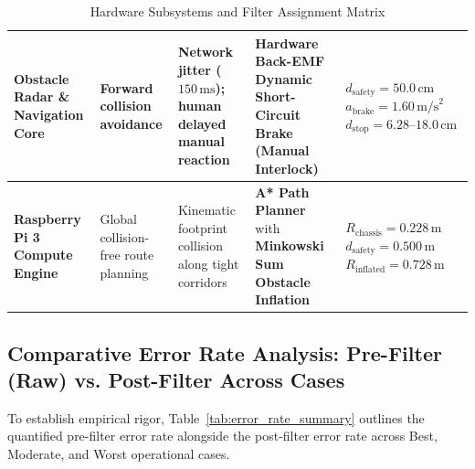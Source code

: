 \documentclass[11pt, a4paper]{article}
\begin{document}
\begin{table}[H]
\begin{tabularx}{\textwidth}{L{2.5cm} L{2.5cm} L{3.5cm} L{3.5cm} Y}
\midrule
\textbf{Obstacle Radar \& Navigation Core} & Forward collision avoidance & Network jitter ($150\,\text{ms}$); human delayed manual reaction & \textbf{Hardware Back-EMF Dynamic Short-Circuit Brake} (Manual Interlock) & $d_{\text{safety}} = 50.0\,\text{cm}$ \newline $a_{\text{brake}} = 1.60\,\text{m/s}^2$ \newline $d_{\text{stop}} = 6.28\text{--}18.0\,\text{cm}$ \\
\midrule
\textbf{Raspberry Pi 3 Compute Engine} & Global collision-free route planning & Kinematic footprint collision along tight corridors & \textbf{A* Path Planner} with \textbf{Minkowski Sum Obstacle Inflation} & $R_{\text{chassis}} = 0.228\,\text{m}$ \newline $d_{\text{safety}} = 0.500\,\text{m}$ \newline $R_{\text{inflated}} = 0.728\,\text{m}$ \\
\bottomrule
\end{tabularx}
\caption{Hardware Subsystems and Filter Assignment Matrix}
\label{tab:comp_filter_map}
\end{table}

\subsection{Comparative Error Rate Analysis: Pre-Filter (Raw) vs. Post-Filter Across Cases}
To establish empirical rigor, Table~\ref{tab:error_rate_summary} outlines the quantified pre-filter error rate alongside the post-filter error rate across Best, Moderate, and Worst operational cases.
\end{document}
